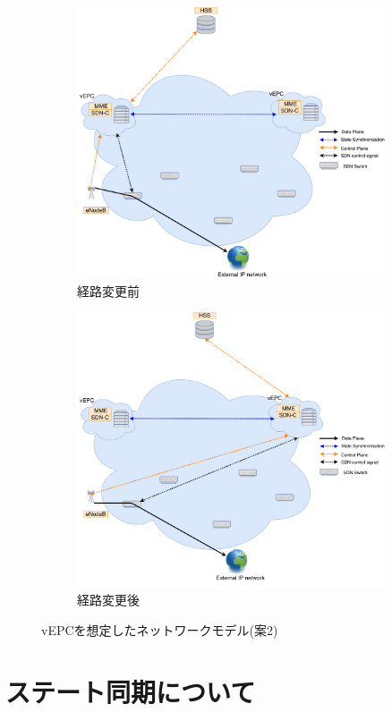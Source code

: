 \documentclass[a4j]{ujarticle}
\begin{document}
\begin{figure}[p]
	\centering
		\begin{subfigure}{1.0\textwidth}
		\centering
			\includegraphics[width=0.5\hsize]{vEPC_SDN_before.pdf}
			\caption{経路変更前}
			\label{vEPC_SDN_before}
		\end{subfigure}
		\begin{subfigure}{1.0\textwidth}
		\centering
			\includegraphics[width=0.5\hsize]{vEPC_SDN_after.pdf}
			\caption{経路変更後}
			\label{vEPC_SDN_after}
		\end{subfigure}
		\caption{vEPCを想定したネットワークモデル(案2)}
		\label{vEPC_SDN}
\end{figure}

%

\clearpage


\section{ステート同期について}
\end{document}
